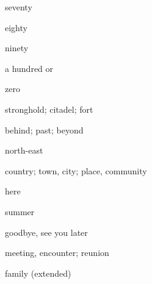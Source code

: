 \documentclass[avery5371,grid,frame]{flashcards}
\begin{document}
\begin{flashcard}{\LARGE seventy}
\LARGE {}
\end{flashcard}
\begin{flashcard}{\LARGE eighty}
\LARGE {}
\end{flashcard}
\begin{flashcard}{\LARGE ninety}
\LARGE {}
\end{flashcard}
\begin{flashcard}{\LARGE a hundred}
\LARGE {} or 
\end{flashcard}
\begin{flashcard}{\LARGE zero}
\LARGE {}
\end{flashcard}
\begin{flashcard}{\LARGE stronghold; citadel; fort}
\LARGE {}
\end{flashcard}
\begin{flashcard}{\LARGE behind; past; beyond}
\LARGE {}
\end{flashcard}
\begin{flashcard}{\LARGE north-east}
\LARGE {}
\end{flashcard}
\begin{flashcard}{\LARGE country; town, city; place, community}
\LARGE {}
\end{flashcard}
\begin{flashcard}{\LARGE here}
\LARGE {}
\end{flashcard}
\begin{flashcard}{\LARGE summer}
\LARGE {}
\end{flashcard}
\begin{flashcard}{\LARGE goodbye, see you later}
\LARGE {}
\end{flashcard}
\begin{flashcard}{\LARGE meeting, encounter; reunion}
\LARGE {}
\end{flashcard}
\begin{flashcard}{\LARGE family (extended)}
\LARGE {}
\end{flashcard}
\end{document}

